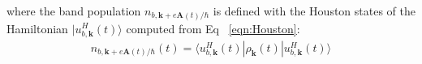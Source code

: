 where the band population $n_{b,\boldsymbol{k}+e\boldsymbol{A}(t)/\hbar}$ is defined with the Houston states of the Hamiltonian $|u^H_{b,\boldsymbol k} (t)\rangle$ computed from Eq ~\ref{eqn:Houston}:
\begin{align}
n_{b,\boldsymbol{k}+e\boldsymbol{A}(t)/\hbar}(t)=\langle u^H_{b,\boldsymbol k}(t) |\rho_{\boldsymbol{k}}(t)|u^H_{b,\boldsymbol k}(t) \rangle
\end{align}


